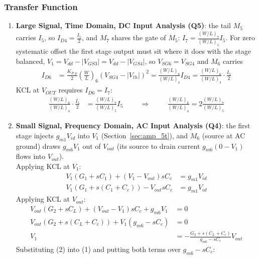 \subsubsection{Transfer Function}
\begin{enumerate}
  \item \textbf{Large Signal, Time Domain, DC Input Analysis (Q5)}:
    the tail \(M_5\) carries \(I_5\), so \(I_{D4} = \frac{I_5}{2}\), and \(M_7\) shares the
    gate of \(M_5\): \(I_7 = \frac{(W/L)_7}{(W/L)_5} I_5\). For zero systematic
    offset the first stage output must sit where it does with the stage
    balanced, \(V_1 = V_{dd} - |V_{GS3}| = V_{dd} - |V_{GS4}|\), so
    \(V_{SG6} = V_{SG4}\) and \(M_6\) carries
    \begin{align*}
      I_{D6} &= \frac{K_{P,p}}{2}\left(\frac{W}{L}\right)_6 (V_{SG4} - |V_{th}|)^2 = \frac{(W/L)_6}{(W/L)_4} I_{D4} = \frac{(W/L)_6}{(W/L)_4}\cdot\frac{I_5}{2}
    \end{align*}
    KCL at \(V_{OUT}\) requires \(I_{D6} = I_7\):
    \begin{align*}
      \frac{(W/L)_6}{(W/L)_4}\cdot\frac{I_5}{2} &= \frac{(W/L)_7}{(W/L)_5} I_5 \hspace{1cm} \Rightarrow \hspace{1cm}
      \frac{(W/L)_6}{(W/L)_4} = 2\frac{(W/L)_7}{(W/L)_5}
    \end{align*}
  \item \textbf{Small Signal, Frequency Domain, AC Input Analysis (Q4)}:
    the first stage injects \(g_{m1} V_{id}\) into \(V_1\) (Section~\ref{sec:amp_5t}),
    and \(M_6\) (source at AC ground) draws \(g_{m6} V_1\) out of \(V_{out}\) (its
    source to drain current \(g_{m6}(0 - V_1)\) flows into \(V_{out}\)).\\
    Applying KCL at \(V_1\):
    \begin{align*}
      V_1 (G_1 + sC_1) + (V_1 - V_{out}) sC_c &= g_{m1} V_{id} \\
      V_1 (G_1 + s(C_1 + C_c)) - V_{out} sC_c &= g_{m1} V_{id} \tag{1}
    \end{align*}
    Applying KCL at \(V_{out}\):
    \begin{align*}
      V_{out}(G_2 + sC_L) + (V_{out} - V_1) sC_c + g_{m6} V_1 &= 0 \\
      V_{out}(G_2 + s(C_L + C_c)) + V_1 (g_{m6} - sC_c) &= 0 \\
      V_1 &= -\frac{G_2 + s(C_L + C_c)}{g_{m6} - sC_c} V_{out} \tag{2}
    \end{align*}
    Substituting (2) into (1) and putting both terms over \(g_{m6} - sC_c\):

\end{enumerate}
